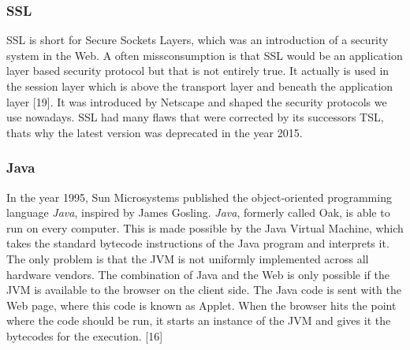 \documentclass[runningheads]{llncs}
\begin{document}
			\subsubsection{SSL}
			\leavevmode\newline
			SSL is short for Secure Sockets Layers, which was an introduction of a security system in the Web. A often missconsumption is that SSL would be an application layer based security protocol but that is not entirely true. It actually is used in the session layer which is above the transport layer and beneath the application layer [19]. It was introduced by Netscape and shaped the security protocols we use nowadays. SSL had many flaws that were corrected by its successors TSL, thats why the latest version was deprecated in the year 2015.
			\subsubsection{Java}
			\leavevmode\newline
			In the year 1995, Sun Microsystems published the object-oriented programming language \textit{Java}, inspired by James Gosling. \textit{Java}, formerly called Oak, is able to run on every computer. This is made possible by the Java Virtual Machine, which takes the standard bytecode instructions of the Java program and interprets it. The only problem is that the JVM is not uniformly implemented across all hardware vendors. The combination of Java and the Web is only possible if the JVM is available to the browser on the client side. The Java code is sent with the Web page, where this code is known as Applet. When the browser hits the point where the code should be run, it starts an instance of the JVM and gives it the bytecodes for the execution. [16]
\end{document}
